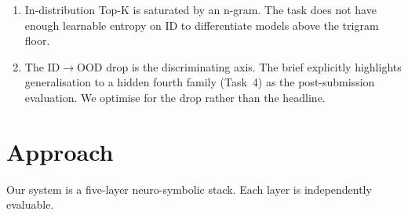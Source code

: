 \documentclass[11pt,a4paper]{article}
\begin{document}
\begin{enumerate}[leftmargin=*,itemsep=0pt]
\item In-distribution Top-K is saturated by an n-gram. The task does not have enough learnable entropy on ID to differentiate models above the trigram floor.
\item The ID$\rightarrow$OOD drop is the discriminating axis. The brief explicitly highlights generalisation to a hidden fourth family (Task~4) as the post-submission evaluation. We optimise for the drop rather than the headline.
\end{enumerate}

\section{Approach}\label{sec:approach}

Our system is a five-layer neuro-symbolic stack. Each layer is independently evaluable.
\end{document}
